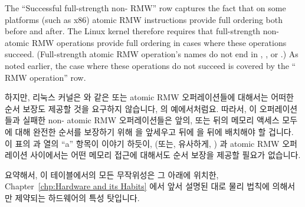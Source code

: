 {	The ``Successful full-strength non- RMW'' row captures
	the fact that on some platforms (such as x86) atomic RMW instructions
	provide full ordering both before and after.
	The Linux kernel therefore requires that full-strength non-
	atomic RMW operations provide full ordering in cases where these
	operations succeed.
	(Full-strength atomic RMW operation's names do not end in
	, , or .)
	As noted earlier, the case where these operations do not succeed
	is covered by the `` RMW operation'' row.
	\fi

	하지만, 리눅스 커널은  와 같은  또는
	 atomic RMW 오퍼레이션들에 대해서는 어떠한 순서 보장도
	제공할 것을 요구하지 않습니다,  의 예에서처럼요.
	따라서, 이 오퍼레이션들과 실패한 non- atomic RMW
	오퍼레이션들은 앞의, 또는 뒤의 메모리 액세스 모두에 대해 완전한 순서를
	보장하기 위해  을 앞세우고 뒤에
	 을 뒤에 배치해야 할 겁니다.
	이 표의  과 
	열의 ``a'' 항목이 이야기 하듯이,  (또는,
	유사하게, ) 과 atomic RMW 오퍼레이션
	사이에서는 어떤 메모리 접근에 대해서도 순서 보장을 제공할 필요가
	없습니다.

	요약해서, 이 테이블에서의 모든 무작위성은 그 아래에 위치한,
	Chapter~\ref{chp:Hardware and its Habits} 에서 앞서 설명된 대로 물리
	법칙에 의해서만 제약되는 하드웨어의 특성 탓입니다.

} \QuickQuizEnd

